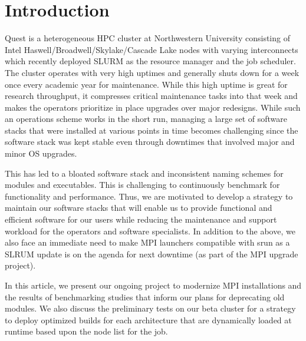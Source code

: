 \documentclass[manuscript,screen]{acmart}
\begin{document}


\maketitle

\section{Introduction}

Quest is a heterogeneous HPC cluster\cite{quest} at Northwestern University consisting of Intel Haswell/Broadwell/Skylake/Cascade Lake nodes with varying interconnects which recently deployed SLURM\cite{slurm} as the resource manager and the job scheduler. The cluster operates with very high uptimes and generally shuts down for a week once every academic year for maintenance. While this high uptime is great for research throughput, it compresses critical maintenance tasks into that week and makes the operators prioritize in place upgrades over major redesigns. While such an operations scheme works in the short run, managing a large set of software stacks that were installed at various points in time becomes challenging since the software stack was kept stable even through downtimes that involved major and minor OS upgrades.

This has led to a bloated software stack and inconsistent naming schemes for modules and executables. This is challenging to continuously benchmark for functionality and performance. Thus, we are motivated to develop a strategy to maintain our software stacks that will enable us to provide functional and efficient software for our users while reducing the maintenance and support workload for the operators and software specialists. In addition to the above, we also face an immediate need to make MPI launchers compatible with srun as a SLRUM update is on the agenda for next downtime (as part of the MPI upgrade project).

In this article, we present our ongoing project to modernize MPI installations and the results of benchmarking studies that inform our plans for deprecating old modules. We also discuss the preliminary tests on our beta cluster for a strategy to deploy optimized builds for each architecture that are dynamically loaded at runtime based upon the node list for the job.
\end{document}
